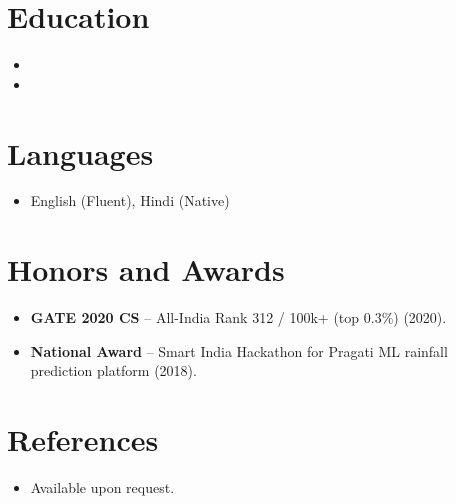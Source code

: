 \documentclass[11pt,a4paper,sans]{moderncv}
\begin{document}
\section{Education}
\vspace{1pt}
\begin{itemize}

\item{}

\vspace{3pt}

\item{}

\end{itemize}


\section{Languages}
\vspace{1pt}
\begin{itemize}
\item English (Fluent), Hindi (Native)
\end{itemize}


\section{Honors and Awards}
\vspace{1pt}
\begin{itemize}
\item \textbf{GATE 2020 CS} -- All-India Rank 312 / 100k+ (top 0.3\%) (2020).
\item \textbf{National Award} -- Smart India Hackathon for Pragati ML rainfall prediction platform (2018).
\end{itemize}


\section{References}
\vspace{1pt}
\begin{itemize}
\item Available upon request.
\end{itemize}
\end{document}
